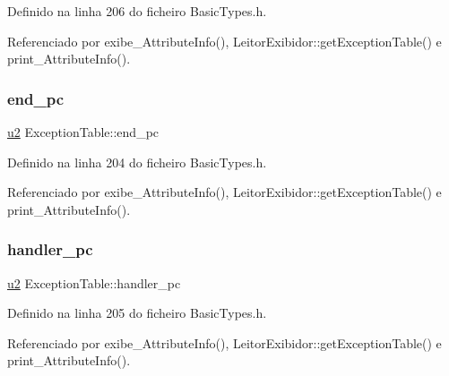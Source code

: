Definido na linha 206 do ficheiro Basic\+Types.\+h.



Referenciado por exibe\+\_\+\+Attribute\+Info(), Leitor\+Exibidor\+::get\+Exception\+Table() e print\+\_\+\+Attribute\+Info().

\mbox{\label{structExceptionTable_ac2df73606ebe48af50a629f83fe9c677}} 
\subsubsection{\texorpdfstring{end\+\_\+pc}{end\_pc}}
{\footnotesize\ttfamily \hyperlink{BasicTypes_8h_a732cde1300aafb73b0ea6c2558a7a54f}{u2} Exception\+Table\+::end\+\_\+pc}



Definido na linha 204 do ficheiro Basic\+Types.\+h.



Referenciado por exibe\+\_\+\+Attribute\+Info(), Leitor\+Exibidor\+::get\+Exception\+Table() e print\+\_\+\+Attribute\+Info().

\mbox{\label{structExceptionTable_a664ec4b395e02d3a5bfa6cef3493c1e7}} 
\subsubsection{\texorpdfstring{handler\+\_\+pc}{handler\_pc}}
{\footnotesize\ttfamily \hyperlink{BasicTypes_8h_a732cde1300aafb73b0ea6c2558a7a54f}{u2} Exception\+Table\+::handler\+\_\+pc}



Definido na linha 205 do ficheiro Basic\+Types.\+h.



Referenciado por exibe\+\_\+\+Attribute\+Info(), Leitor\+Exibidor\+::get\+Exception\+Table() e print\+\_\+\+Attribute\+Info().

\mbox{\label{structExceptionTable_af137b3a966825f91146039797d3b1ba5}} 

